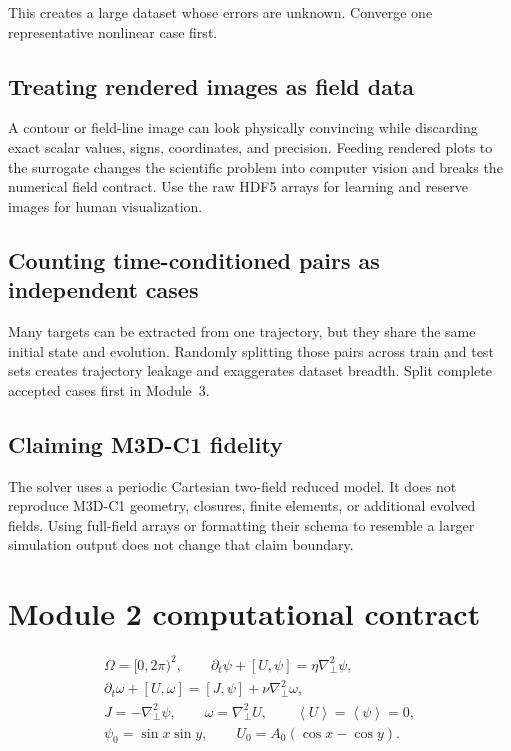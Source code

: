 \documentclass[11pt]{article}
\newcommand{\pd}{\partial}
\newcommand{\average}[1]{\left\langle #1\right\rangle}
\newcommand{\Lap}{\nabla_{\!\perp}^{2}}
\begin{document}
This creates a large dataset whose errors are unknown. Converge one representative nonlinear case first.

\subsection{Treating rendered images as field data}

A contour or field-line image can look physically convincing while discarding exact scalar values, signs, coordinates, and precision. Feeding rendered plots to the surrogate changes the scientific problem into computer vision and breaks the numerical field contract. Use the raw HDF5 arrays for learning and reserve images for human visualization.

\subsection{Counting time-conditioned pairs as independent cases}

Many targets can be extracted from one trajectory, but they share the same initial state and evolution. Randomly splitting those pairs across train and test sets creates trajectory leakage and exaggerates dataset breadth. Split complete accepted cases first in Module~3.

\subsection{Claiming M3D-C1 fidelity}

The solver uses a periodic Cartesian two-field reduced model. It does not reproduce M3D-C1 geometry, closures, finite elements, or additional evolved fields. Using full-field arrays or formatting their schema to resemble a larger simulation output does not change that claim boundary.

\section{Module 2 computational contract}
\label{sec:summarycontract}

\begin{conventionbox}
\[
\begin{gathered}
\Omega=[0,2\pi)^2,\qquad
\pd_t\psi+[U,\psi]=\eta\Lap\psi,\\
\pd_t\omega+[U,\omega]=[J,\psi]+\nu\Lap\omega,\\
J=-\Lap\psi,\qquad \omega=\Lap U,\qquad
\average{U}=\average{\psi}=0,\\
\psi_0=\sin x\sin y,\qquad
U_0=A_0(\cos x-\cos y).
\end{gathered}
\]
\end{conventionbox}
\end{document}
